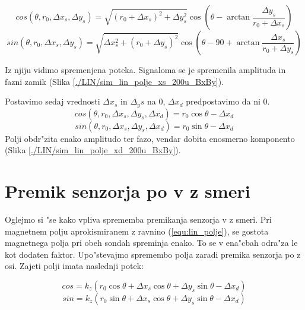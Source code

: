 \begin{equation}
\label{equ:Bx_stat}
cos(\theta,r_0,\Delta x_s, \Delta y_s)= \sqrt{(r_0+\Delta x_s)^2+\Delta y_s^2}\cos(\theta -\arctan \frac{\Delta y_s}{r_0+\Delta x_s})
\end{equation}
\begin{equation}\label{equ:By_stat}
sin(\theta,r_0,\Delta x_s, \Delta y_s)= \sqrt{\Delta x_s^2+(r_0+\Delta y_s)^2} \cos(\theta - 90 +\arctan \frac{\Delta x_s}{r_0+\Delta y_s})
\end{equation}

Iz njiju vidimo spremenjena poteka. Signaloma se je spremenila amplituda in fazni zamik (Slika \ref{./LIN/sim_lin_polje_xs_200u_BxBy}).


Postavimo sedaj vrednosti $\Delta x_s$ in $\Delta_ys$ na 0, $\Delta x_d$ predpostavimo da ni 0.
\begin{equation}
\label{equ:Bx_din}
cos(\theta,r_0,\Delta x_s, \Delta y_s, \Delta x_d)= r_0 \cos\theta-\Delta x_d
\end{equation}
\begin{equation}
\label{equ:By_din}
sin(\theta,r_0,\Delta x_s, \Delta y_s, \Delta x_d)= r_0 \sin\theta-\Delta x_d
\end{equation}
Polji obdr"zita enako amplitudo ter fazo, vendar dobita enosmerno komponento (Slika \ref{./LIN/sim_lin_polje_xd_200u_BxBy}).





\section{Premik senzorja po  v z smeri}

Oglejmo si "se kako vpliva sprememba premikanja senzorja v z smeri.
Pri magnetnem polju aprokismiranem z ravnino (\ref{equ:lin_polje}), se gostota magnetnega polja pri obeh sondah spreminja enako. To se v ena"cbah odra"za le kot dodaten faktor. Upo"stevajmo spremembo polja zaradi premika senzorja po z osi. Zajeti polji imata naslednji potek:


\begin{equation}\label{equ:Bx_z}
cos=k_z( r_0 \cos\theta +\Delta x_s \cos\theta +\Delta y_s \sin\theta -\Delta x_d)
\end{equation}
\begin{equation}\label{equ:By_z}
sin=k_z( r_0 \sin\theta +\Delta x_s \cos\theta +\Delta y_s \sin\theta-\Delta x_d)
\end{equation}

